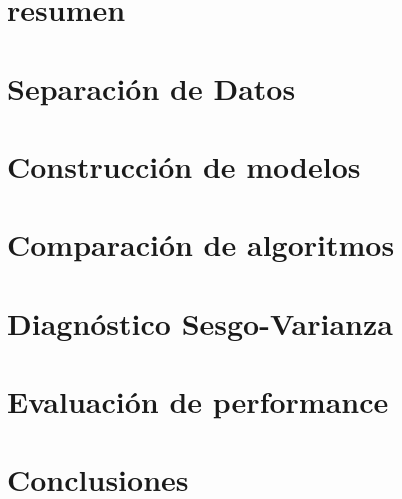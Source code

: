 \documentclass{./packages/informe}
\begin{document}
 



\section*{resumen}


\vspace{1em}
\tableofcontents
\newpage

\section{Separación de Datos}


\section{Construcción de modelos}


\vspace{1em}
\section{Comparación de algoritmos}


\vspace{1em}
\section{Diagnóstico Sesgo-Varianza}


\vspace{1em}
\section{Evaluación de performance}


\vspace{1em}
\section{Conclusiones}


% 

\newpage


\end{document}
